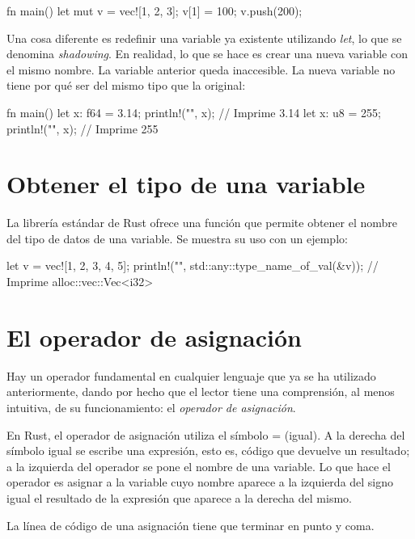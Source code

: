 \vspace{0.7em}
\begin{Codigo}
fn main() {
   let mut v = vec![1, 2, 3];
   v[1] = 100;
   v.push(200);
}
\end{Codigo}

Una cosa diferente es redefinir una variable ya existente utilizando \textit{let}, lo que se denomina \textit{shadowing}. En realidad, lo que se hace es crear una nueva variable con el mismo nombre. La variable anterior queda inaccesible. La nueva variable no tiene por qué ser del mismo tipo que la original:

\vspace{0.7em}
\begin{Codigo}
fn main() {
   let x: f64 = 3.14;
   println!("{}", x); // Imprime 3.14
   let x: u8 = 255;
   println!("{}", x); // Imprime 255
}
\end{Codigo}

\section{Obtener el tipo de una variable}
La librería estándar de Rust ofrece una función que permite obtener el nombre del tipo de datos de una variable. Se muestra su uso con un ejemplo:

\vspace{0.7em}
\begin{Codigo}
let v = vec![1, 2, 3, 4, 5];
println!("{}", std::any::type_name_of_val(&v)); 
// Imprime alloc::vec::Vec<i32>
\end{Codigo}

\section{El operador de asignación}
Hay un operador fundamental en cualquier lenguaje que ya se ha utilizado anteriormente, dando por hecho que el lector tiene una comprensión, al menos intuitiva, de su funcionamiento: el \textit{operador de asignación}. 

En Rust, el operador de asignación utiliza el símbolo = (igual). A la derecha del símbolo igual se escribe una expresión, esto es, código que devuelve un resultado; a la izquierda del operador se pone el nombre de una variable. Lo que hace el operador es asignar a la variable cuyo nombre aparece a la izquierda del signo igual el resultado de la expresión que aparece a la derecha del mismo. 

La línea de código de una asignación tiene que terminar en punto y coma. 

